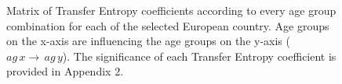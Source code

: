 \documentclass[Harvard,Times1COL]{WileyNJDv5}
\begin{document}
{\begin{figure}[h]
{

}

\caption{\label{fig-te}Matrix of Transfer Entropy coefficients according
to every age group combination for each of the selected European
country. Age groups on the x-axis are influencing the age groups on the
y-axis (\(ag\,x \rightarrow\,ag\,y\)). The significance of each Transfer
Entropy coefficient is provided in Appendix 2.}

\end{figure}%

}
\end{document}
